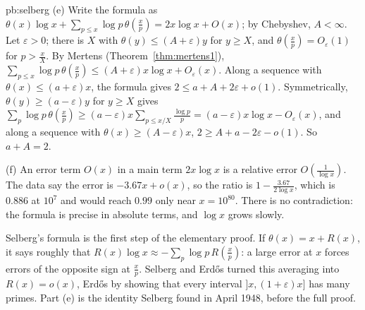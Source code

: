 \begin{solution}{pb:selberg}
(e) Write the formula as $\theta(x)\log x+\sum_{p\le x}\log p\,\theta(\frac xp)=2x\log x+O(x)$; by Chebyshev, $A<\infty$. Let $\varepsilon>0$; there is $X$ with $\theta(y)\le(A+\varepsilon)y$ for $y\ge X$,
and $\theta(\frac xp)=O_\varepsilon(1)$ for $p>\frac xX$. By Mertens (Theorem~\ref{thm:mertens1}), $\sum_{p\le x}\log p\,\theta(\frac xp)\le(A+\varepsilon)x\log x+O_\varepsilon(x)$. Along a sequence with
$\theta(x)\le(a+\varepsilon)x$, the formula gives $2\le a+A+2\varepsilon+o(1)$. Symmetrically, $\theta(y)\ge(a-\varepsilon)y$ for $y\ge X$ gives
$\sum_p\log p\,\theta(\frac xp)\ge(a-\varepsilon)x\sum_{p\le x/X}\frac{\log p}p=(a-\varepsilon)x\log x-O_\varepsilon(x)$, and along a sequence with $\theta(x)\ge(A-\varepsilon)x$, $2\ge A+a-2\varepsilon-o(1)$.
So $a+A=2$.

(f) An error term $O(x)$ in a main term $2x\log x$ is a relative error $O(\frac1{\log x})$. The data say the error is $-3.67x+o(x)$, so the ratio is $1-\frac{3.67}{2\log x}$, which is
$0.886$ at $10^7$ and would reach $0.99$ only near $x=10^{80}$. There is no contradiction: the formula is precise in absolute terms, and $\log x$ grows slowly.


\leads Selberg's formula is the first step of the elementary proof. If $\theta(x)=x+R(x)$, it says roughly that $R(x)\log x\approx-\sum_p\log p\,R(\frac xp)$: a large error at $x$ forces
errors of the opposite sign at $\frac xp$. Selberg and Erd\H os turned this averaging into $R(x)=o(x)$, Erd\H os by showing that every interval $]x,(1+\varepsilon)x]$ has many primes.
Part (e) is the identity Selberg found in April 1948, before the full proof.
\end{solution}

